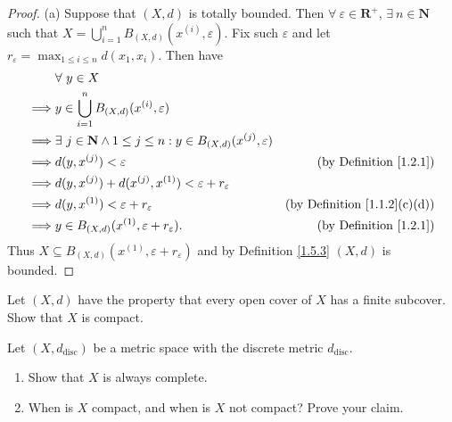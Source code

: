 \begin{proof}{(a)}
    Suppose that \((X, d)\) is totally bounded.
    Then \(\forall\ \varepsilon \in \mathbf{R}^+\), \(\exists\ n \in \mathbf{N}\) such that \(X = \bigcup_{i = 1}^n B_{(X, d)}(x^{(i)}, \varepsilon)\).
    Fix such \(\varepsilon\) and let \(r_{\varepsilon} = \max_{1 \leq i \leq n} d(x_1, x_i)\).
    Then have
    \begin{align*}
                 & \forall\ y \in X                                                                                                                    \\
        \implies & y \in \bigcup_{i = 1}^n B_{(X, d)}(x^{(i)}, \varepsilon)                                                                            \\
        \implies & \exists\ j \in \mathbf{N} \land 1 \leq j \leq n : y \in B_{(X, d)}(x^{(j)}, \varepsilon)                                            \\
        \implies & d(y, x^{(j)}) < \varepsilon                                                              & \text{(by Definition \ref{1.2.1})}       \\
        \implies & d(y, x^{(j)}) + d(x^{(j)}, x^{(1)}) < \varepsilon + r_{\varepsilon}                                                                 \\
        \implies & d(y, x^{(1)}) < \varepsilon + r_{\varepsilon}                                            & \text{(by Definition \ref{1.1.2}(c)(d))} \\
        \implies & y \in B_{(X, d)}(x^{(1)}, \varepsilon + r_{\varepsilon}).                                & \text{(by Definition \ref{1.2.1})}
    \end{align*}
    Thus \(X \subseteq B_{(X, d)}(x^{(1)}, \varepsilon + r_{\varepsilon})\) and by Definition \ref{1.5.3} \((X, d)\) is bounded.
\end{proof}

\begin{exercise}\label{ex 1.5.11}
    Let \((X, d)\) have the property that every open cover of \(X\) has a finite subcover.
    Show that \(X\) is compact.
\end{exercise}

\begin{exercise}\label{ex 1.5.12}
    Let \((X, d_{\text{disc}})\) be a metric space with the discrete metric \(d_{\text{disc}}\).
    \begin{enumerate}
        \item Show that \(X\) is always complete.
        \item When is \(X\) compact, and when is \(X\) not compact?
              Prove your claim.
    \end{enumerate}
\end{exercise}

